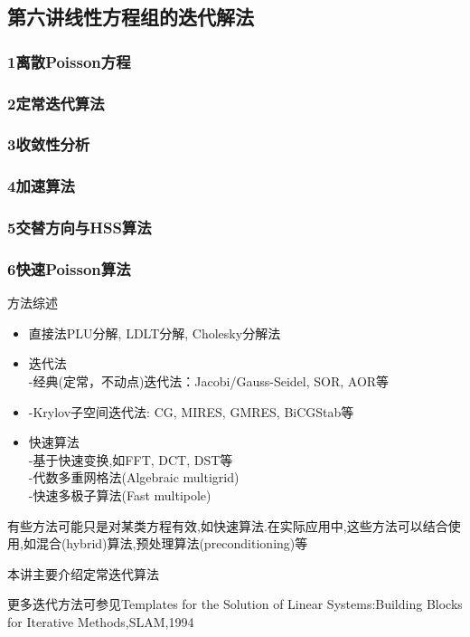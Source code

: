 \documentclass[12pt,a4paper]{article}
\title{}
\author{作者}
\date{\chntoday}
\begin{document}
\maketitle
\newpage
\subsection*{\color{blue}第六讲\qquad 线性方程组的迭代解法}
\subsubsection*{\color{blue}1\quad 离散Poisson方程}
\subsubsection*{\color{blue}2\quad 定常迭代算法}
\subsubsection*{\color{blue}3\quad 收敛性分析}
\subsubsection*{\color{blue}4\quad 加速算法}
\subsubsection*{\color{blue}5\quad 交替方向与HSS算法}
\subsubsection*{\color{blue}6\quad 快速Poisson算法}
方法综述\\
\begin {itemize}
	\item 直接法\quad PLU分解, LDLT分解, Cholesky分解法\\
        \item 迭代法\\
                -经典(定常，不动点)迭代法：Jacobi/Gauss-Seidel, SOR, AOR等\\
        \item -Krylov子空间迭代法: CG, MIRES, GMRES, BiCGStab等\\
        \item 快速算法\\
		-基于快速变换,如FFT, DCT, DST等\\
                -代数多重网格法(Algebraic multigrid)\\
                -快速多极子算法(Fast multipole)\\
\end{itemize}
有些方法可能只是对某类方程有效,如快速算法.在实际应用中,这些方法可以结合使用,如混合(hybrid)算法,预处理算法(preconditioning)等\\
\centerline{本讲主要介绍定常迭代算法}
更多迭代方法可参见{\color{blue}Templates for the Solution of Linear Systems:Building Blocks for Iterative Methods,}SLAM,1994\\
\end{document}
